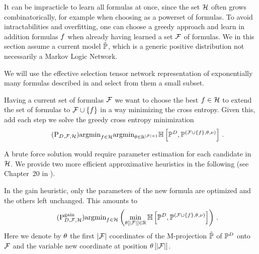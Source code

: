 








It can be impracticle to learn all formulas at once, since the set $\mathcal{H}$ often grows combinatorically, for example when choosing as a powerset of formulas.
To avoid intractabilities and overfitting, one can choose a greedy approach and learn in addition formulas $f$ when already having learned a set $\mathcal{F}$ of formulas.
We in this section assume a current model $\tilde{\mathbb{P}}$, which is a generic positive distribution not necessarily a Markov Logic Network. %

% 
We will use the effective selection tensor network representation of exponentially many formulas described in  and select from them a small subset.




Having a current set of formulas $\mathcal{F}$ we want to choose the best $f\in\mathcal{H}$ to extend the set of formulas to $\mathcal{F}\cup\{f\}$ in a way minimizing the cross entropy.
Given this, add each step we solve the greedy cross entropy minimization
\begin{align}
    \label{prob:perfectGreedy}\tag{$\mathrm{P}_{\datamap,\formulaset,\fselectionmap}$}
    \argmin_{\formula\in\fselectionmap} \argmin_{\canparam\in\rr^{\cardof{\formulaset}+1}}
    \centropyof{\empdistribution}{\expdistof{(\formulaset\cup\{\formula\},\canparam,\basemeasure)}} \, .
\end{align}


A brute force solution would require parameter estimation for each candidate in $\mathcal{H}$.
We provide two more efficient approximative heuristics in the following (see Chapter~20 in \cite{koller_probabilistic_2009}).



In the gain heuristic, only the parameters of the new formula are optimized and the others left unchanged.
This amounts to
\begin{align}
    \label{prob:greedyGain}\tag{$\mathrm{P}^{\mathrm{gain}}_{\datamap,\formulaset,\fselectionmap}$}
    \argmin_{\formula\in\fselectionmap} \left ( \min_{\canparamat{\cardof{\formulaset}}\in\rr}
    \centropyof{\empdistribution}{\expdistof{(\formulaset\cup\{\formula\},\canparam,\basemeasure)}} \right) \, .
\end{align}
Here we denote by $\theta$ the first $\left|\mathcal{F}\right|$ coordinates of the M-projection $\tilde{\mathbb{P}}$  of $\mathbb{P}^{D}$ onto $\mathcal{F}$ and the variable new coordinate at position $\theta\left[\left|\mathcal{F}\right|\right]$.

